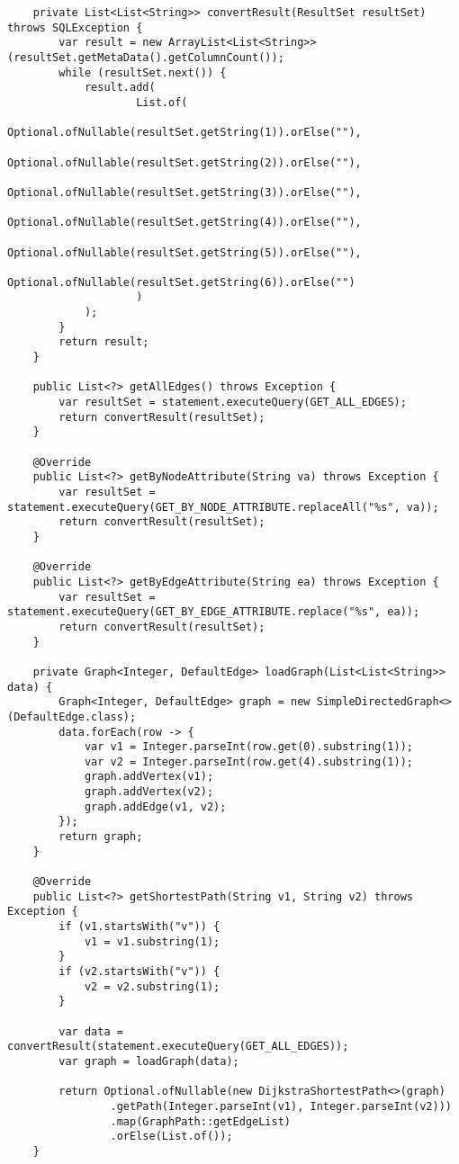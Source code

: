 \begin{lstlisting}
    private List<List<String>> convertResult(ResultSet resultSet) throws SQLException {
        var result = new ArrayList<List<String>>(resultSet.getMetaData().getColumnCount());
        while (resultSet.next()) {
            result.add(
                    List.of(
                            Optional.ofNullable(resultSet.getString(1)).orElse(""),
                            Optional.ofNullable(resultSet.getString(2)).orElse(""),
                            Optional.ofNullable(resultSet.getString(3)).orElse(""),
                            Optional.ofNullable(resultSet.getString(4)).orElse(""),
                            Optional.ofNullable(resultSet.getString(5)).orElse(""),
                            Optional.ofNullable(resultSet.getString(6)).orElse("")
                    )
            );
        }
        return result;
    }

    public List<?> getAllEdges() throws Exception {
        var resultSet = statement.executeQuery(GET_ALL_EDGES);
        return convertResult(resultSet);
    }

    @Override
    public List<?> getByNodeAttribute(String va) throws Exception {
        var resultSet = statement.executeQuery(GET_BY_NODE_ATTRIBUTE.replaceAll("%s", va));
        return convertResult(resultSet);
    }

    @Override
    public List<?> getByEdgeAttribute(String ea) throws Exception {
        var resultSet = statement.executeQuery(GET_BY_EDGE_ATTRIBUTE.replace("%s", ea));
        return convertResult(resultSet);
    }

    private Graph<Integer, DefaultEdge> loadGraph(List<List<String>> data) {
        Graph<Integer, DefaultEdge> graph = new SimpleDirectedGraph<>(DefaultEdge.class);
        data.forEach(row -> {
            var v1 = Integer.parseInt(row.get(0).substring(1));
            var v2 = Integer.parseInt(row.get(4).substring(1));
            graph.addVertex(v1);
            graph.addVertex(v2);
            graph.addEdge(v1, v2);
        });
        return graph;
    }

    @Override
    public List<?> getShortestPath(String v1, String v2) throws Exception {
        if (v1.startsWith("v")) {
            v1 = v1.substring(1);
        }
        if (v2.startsWith("v")) {
            v2 = v2.substring(1);
        }

        var data = convertResult(statement.executeQuery(GET_ALL_EDGES));
        var graph = loadGraph(data);

        return Optional.ofNullable(new DijkstraShortestPath<>(graph)
                .getPath(Integer.parseInt(v1), Integer.parseInt(v2)))
                .map(GraphPath::getEdgeList)
                .orElse(List.of());
    }


\end{lstlisting}
